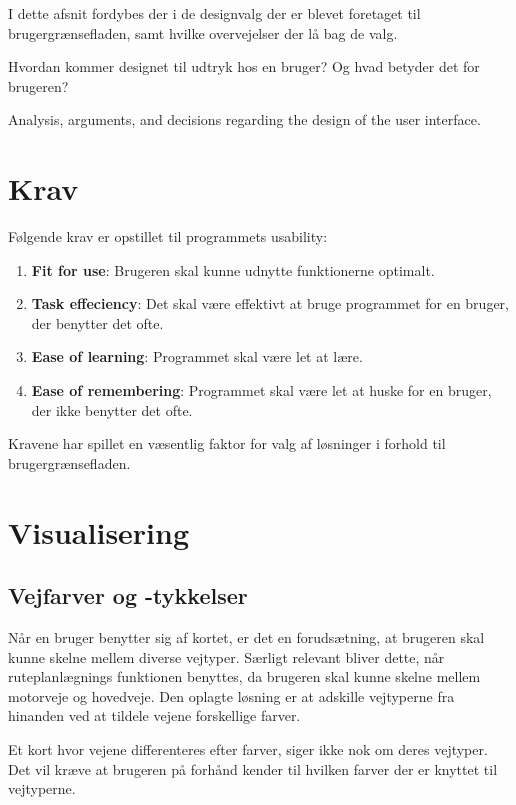 I dette afsnit fordybes der i de designvalg der er blevet foretaget til brugergrænsefladen, samt hvilke overvejelser der lå bag de valg.

Hvordan kommer designet til udtryk hos en bruger? Og hvad betyder det for brugeren?

Analysis, arguments, and decisions regarding the design of the user interface.

\section{Krav}

Følgende krav er opstillet til programmets usability:

\begin{enumerate}
	\item \textbf{Fit for use}: Brugeren skal kunne udnytte funktionerne optimalt. 
	\item \textbf{Task effeciency}: Det skal være effektivt at bruge programmet for en bruger, der benytter det ofte. 
	\item \textbf{Ease of learning}: Programmet skal være let at lære.
	\item \textbf{Ease of remembering}:  Programmet skal være let at huske for en bruger, der ikke benytter det ofte. 
\end{enumerate}

Kravene har spillet en væsentlig faktor for valg af løsninger i forhold til brugergrænsefladen. 

\section{Visualisering}

\subsection{Vejfarver og -tykkelser}

Når en bruger benytter sig af kortet, er det en forudsætning, at brugeren skal kunne skelne mellem diverse vejtyper. Særligt relevant bliver dette, når ruteplanlægnings funktionen benyttes, da brugeren skal kunne skelne mellem motorveje og hovedveje. Den oplagte løsning er at adskille vejtyperne fra hinanden ved at tildele vejene forskellige farver. 

Et kort hvor vejene differenteres efter farver, siger ikke nok om deres vejtyper. Det vil kræve at brugeren på forhånd kender til hvilken farver der er knyttet til vejtyperne. 

